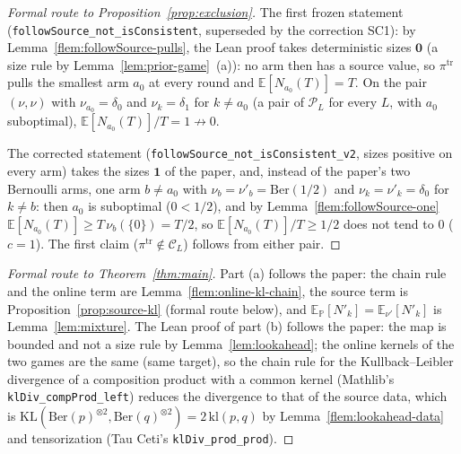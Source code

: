 \documentclass[11pt]{article}
\newcommand{\E}{\mathbb{E}}
\begin{document}
\begin{proof}[Formal route to Proposition~\ref{prop:exclusion}]
The first frozen statement (\texttt{followSource\_not\_isConsistent}, superseded by the correction
SC1): by Lemma~\ref{flem:followSource-pulls}, the Lean proof takes deterministic sizes $\mathbf 0$
(a size rule by Lemma~\ref{lem:prior-game}~(a)): no arm then has a source value, so
$\pi^{\mathrm{tr}}$ pulls the smallest arm $a_0$ at every round and $\E[N_{a_0}(T)]=T$. On the
pair $(\nu,\nu)$ with $\nu_{a_0}=\delta_0$ and $\nu_k=\delta_1$ for $k\ne a_0$ (a pair of
$\mathcal P_L$ for every $L$, with $a_0$ suboptimal), $\E[N_{a_0}(T)]/T=1\not\to0$.

The corrected statement (\texttt{followSource\_not\_isConsistent\_v2}, sizes positive on every
arm) takes the sizes $\mathbf 1$ of the paper, and, instead of the paper's two Bernoulli arms, one
arm $b\ne a_0$ with $\nu_b=\nu'_b=\mathrm{Ber}(1/2)$ and $\nu_k=\nu'_k=\delta_0$ for $k\ne b$: then
$a_0$ is suboptimal ($0<1/2$), and by Lemma~\ref{flem:followSource-one}
$\E[N_{a_0}(T)]\ge T\,\nu_b(\{0\})=T/2$, so $\E[N_{a_0}(T)]/T\ge1/2$ does not tend to $0$ ($c=1$).
The first claim ($\pi^{\mathrm{tr}}\notin\mathcal C_L$) follows from either pair.
\end{proof}

\begin{proof}[Formal route to Theorem~\ref{thm:main}]
Part (a) follows the paper: the chain rule and the online term are
Lemma~\ref{flem:online-kl-chain}, the source term is Proposition~\ref{prop:source-kl} (formal
route below), and $\E_{\mathbb P}[N'_k]=\E_{\nu'}[N'_k]$ is Lemma~\ref{lem:mixture}.
The Lean proof of part (b) follows the paper: the map is bounded and not a size rule by
Lemma~\ref{lem:lookahead}; the online kernels of the two games are the same (same target), so the
chain rule for the Kullback--Leibler divergence of a composition product with a common kernel
(Mathlib's \texttt{klDiv\_compProd\_left}) reduces the divergence to that of the source data,
which is $\mathrm{KL}(\mathrm{Ber}(p)^{\otimes2},\mathrm{Ber}(q)^{\otimes2})=2\,\mathrm{kl}(p,q)$ by
Lemma~\ref{flem:lookahead-data} and tensorization (Tau Ceti's \texttt{klDiv\_prod\_prod}).
\end{proof}
\end{document}
